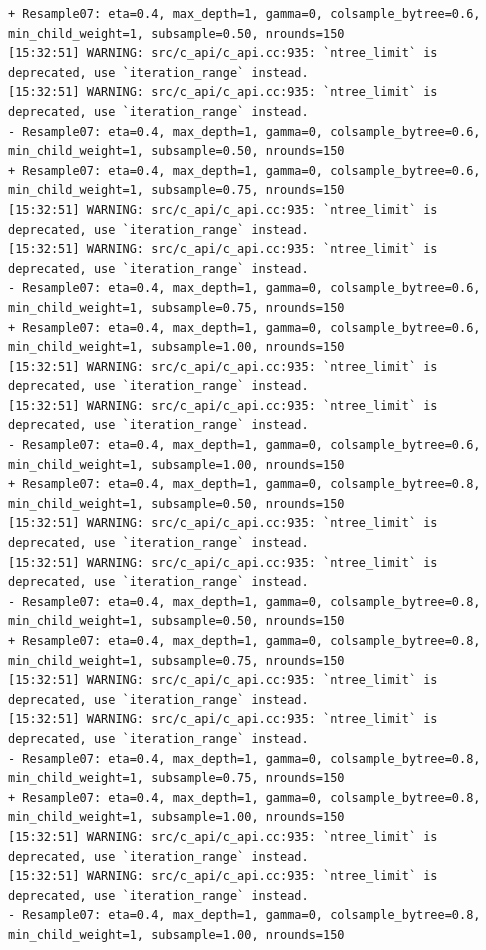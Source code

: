 \documentclass[
  letterpaper,
  DIV=11,
  numbers=noendperiod]{scrartcl}
\begin{document}
\begin{verbatim}
+ Resample07: eta=0.4, max_depth=1, gamma=0, colsample_bytree=0.6, min_child_weight=1, subsample=0.50, nrounds=150 
[15:32:51] WARNING: src/c_api/c_api.cc:935: `ntree_limit` is deprecated, use `iteration_range` instead.
[15:32:51] WARNING: src/c_api/c_api.cc:935: `ntree_limit` is deprecated, use `iteration_range` instead.
- Resample07: eta=0.4, max_depth=1, gamma=0, colsample_bytree=0.6, min_child_weight=1, subsample=0.50, nrounds=150 
+ Resample07: eta=0.4, max_depth=1, gamma=0, colsample_bytree=0.6, min_child_weight=1, subsample=0.75, nrounds=150 
[15:32:51] WARNING: src/c_api/c_api.cc:935: `ntree_limit` is deprecated, use `iteration_range` instead.
[15:32:51] WARNING: src/c_api/c_api.cc:935: `ntree_limit` is deprecated, use `iteration_range` instead.
- Resample07: eta=0.4, max_depth=1, gamma=0, colsample_bytree=0.6, min_child_weight=1, subsample=0.75, nrounds=150 
+ Resample07: eta=0.4, max_depth=1, gamma=0, colsample_bytree=0.6, min_child_weight=1, subsample=1.00, nrounds=150 
[15:32:51] WARNING: src/c_api/c_api.cc:935: `ntree_limit` is deprecated, use `iteration_range` instead.
[15:32:51] WARNING: src/c_api/c_api.cc:935: `ntree_limit` is deprecated, use `iteration_range` instead.
- Resample07: eta=0.4, max_depth=1, gamma=0, colsample_bytree=0.6, min_child_weight=1, subsample=1.00, nrounds=150 
+ Resample07: eta=0.4, max_depth=1, gamma=0, colsample_bytree=0.8, min_child_weight=1, subsample=0.50, nrounds=150 
[15:32:51] WARNING: src/c_api/c_api.cc:935: `ntree_limit` is deprecated, use `iteration_range` instead.
[15:32:51] WARNING: src/c_api/c_api.cc:935: `ntree_limit` is deprecated, use `iteration_range` instead.
- Resample07: eta=0.4, max_depth=1, gamma=0, colsample_bytree=0.8, min_child_weight=1, subsample=0.50, nrounds=150 
+ Resample07: eta=0.4, max_depth=1, gamma=0, colsample_bytree=0.8, min_child_weight=1, subsample=0.75, nrounds=150 
[15:32:51] WARNING: src/c_api/c_api.cc:935: `ntree_limit` is deprecated, use `iteration_range` instead.
[15:32:51] WARNING: src/c_api/c_api.cc:935: `ntree_limit` is deprecated, use `iteration_range` instead.
- Resample07: eta=0.4, max_depth=1, gamma=0, colsample_bytree=0.8, min_child_weight=1, subsample=0.75, nrounds=150 
+ Resample07: eta=0.4, max_depth=1, gamma=0, colsample_bytree=0.8, min_child_weight=1, subsample=1.00, nrounds=150 
[15:32:51] WARNING: src/c_api/c_api.cc:935: `ntree_limit` is deprecated, use `iteration_range` instead.
[15:32:51] WARNING: src/c_api/c_api.cc:935: `ntree_limit` is deprecated, use `iteration_range` instead.
- Resample07: eta=0.4, max_depth=1, gamma=0, colsample_bytree=0.8, min_child_weight=1, subsample=1.00, nrounds=150 

\end{verbatim}
\end{document}
